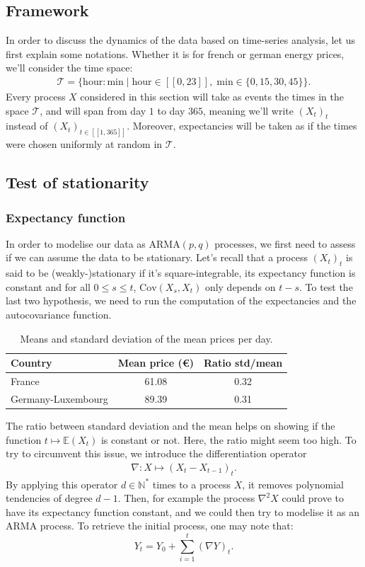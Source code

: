 \documentclass[11pt, a4paper]{article}
\theoremstyle{remark}
\newcommand{\E}{\mathbb{E}}
\newcommand{\T}{\mathcal{T}}
\newcommand{\Cov}{\mathrm{Cov}}
\newcommand{\ARMA}{\mathrm{ARMA}}
\newcommand{\entFF}[2]{[\![ #1, #2 ]\!]}
\newcommand{\N}{\mathbb{N}}
\begin{document}
\subsection{Framework}

In order to discuss the dynamics of the data based on time-series analysis, let us first explain some notations. Whether it is for french or german energy prices, we'll consider the time space:
\begin{align*}
\T = \{ \mathrm{hour}\!:\!\mathrm{min} \mid \mathrm{hour} \in \entFF{0}{23}, \; \mathrm{min} \in \{0, 15, 30, 45\}\}.
\end{align*}
Every process $X$ considered in this section will take as events the times in the space $\T$, and will span from day $1$ to day $365$, meaning we'll write $(X_t)_t$ instead of $(X_t)_{t \in \entFF{1}{365}}$. Moreover, expectancies will be taken as if the times were chosen uniformly at random in $\T$.

\subsection{Test of stationarity}

\subsubsection{Expectancy function}

In order to modelise our data as $\ARMA(p,q)$ processes, we first need to assess if we can assume the data to be stationary. Let's recall that a process $(X_t)_t$ is said to be (weakly-)stationary if it's square-integrable, its expectancy function is constant and for all $0 \leq s \leq t$, $\Cov(X_s, X_t)$ only depends on $t-s$. To test the last two hypothesis, we need to run the computation of the expectancies and the autocovariance function.

\begin{table}[H]
\centering
\caption{Means and standard deviation of the mean prices per day.}
\label{tab:statio}
\begin{tabular}{lcc}
\toprule
Country & Mean price (€) & Ratio std/mean \\
\midrule
France & 61.08 & 0.32  \\
Germany-Luxembourg  & 89.39 & 0.31 \\
\bottomrule
\end{tabular}
\end{table}
The ratio between standard deviation and the mean helps on showing if the function $t \mapsto \E(X_t)$ is constant or not. Here, the ratio might seem too high. To try to circumvent this issue, we introduce the differentiation operator
\begin{align*}
\nabla \colon X \mapsto (X_t - X_{t-1})_t.
\end{align*}
By applying this operator $d \in \N^*$ times to a process $X$, it removes polynomial tendencies of degree $d-1$. Then, for example the process $\nabla^2 X$ could prove to have its expectancy function constant, and we could then try to modelise it as an $\ARMA$ process. To retrieve the initial process, one may note that:
\[ Y_t = Y_0 + \sum_{i=1}^t (\nabla Y)_t.\]
\end{document}
